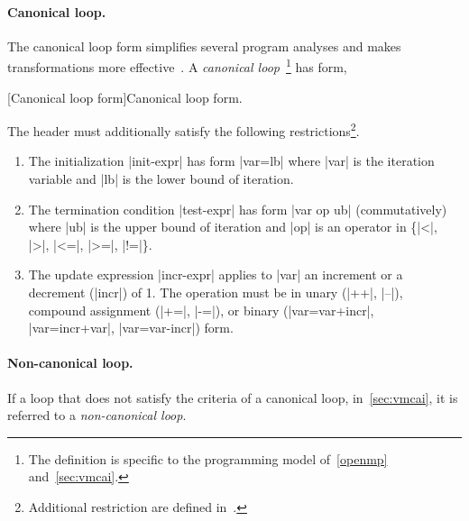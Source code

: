 \paragraph*{Canonical loop.}
The canonical loop form simplifies several program analyses and makes transformations more effective~\cite{llvm_loops}.
A \emph{canonical loop}~\cite[p. 196--202]{openmp_api}\footnote{
The definition is specific to the programming model of~\autoref{openmp} and~\autoref{sec:vmcai}.} has form,
\begin{center}
\begin{minipage}{\textwidth}
\captionsetup{type=lstlisting}
[Canonical loop form]{Canonical loop form.}
\label{lst:canonical}
\end{minipage}
\end{center}
The header must additionally satisfy the following restrictions\footnote{
Additional restriction are defined in~\cite[p. 201]{openmp_api}.}.
\begin{enumerate}
\item The initialization \pr|init-expr| has form \pr|var=lb| where \pr|var| is the iteration variable and \pr|lb| is the lower bound of iteration.
\item The termination condition \pr|test-expr| has form \pr|var op ub| (commutatively)
    where \pr|ub| is the upper bound of iteration and \pr|op| is an operator in \{\pr|<|, \pr|>|, \pr|<=|, \pr|>=|, \pr|!=|\}.
\item The update expression \pr|incr-expr| applies to \pr|var| an increment or a decrement (\pr|incr|) of 1.
The operation must be in unary (\pr|++|, \pr|--|), compound assignment (\pr|+=|, \pr|-=|), or
binary (\pr|var=var+incr|, \pr|var=incr+var|, \pr|var=var-incr|) form.
\end{enumerate}

\paragraph*{Non-canonical loop.}
If a loop that does not satisfy the criteria of a canonical loop, in~\autoref{sec:vmcai}, it is referred to a \emph{non-canonical loop}.


